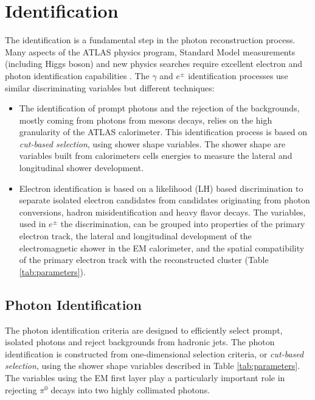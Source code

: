 \documentclass[a4paper, oneside, 11pt, openright]{book}
\begin{document}
		\section{Identification}\label{section:Ident}
			The identification is a fundamental step in the photon reconstruction process. Many aspects of the ATLAS physics program, Standard Model measurements (including Higgs boson) and new physics searches require excellent electron and photon identification capabilities \cite{el_id}\cite{ph_id}. The $\gamma$ and $e^\pm$ identification processes use similar discriminating variables but different techniques:
			\begin{itemize}
				\item The identification of prompt photons and the rejection of the backgrounds, mostly coming from photons from mesons decays, relies on the high granularity of the ATLAS calorimeter. This identification process is based on \textit{cut-based selection}, using shower shape variables. The shower shape are variables built from calorimeters cells energies to measure the lateral and longitudinal shower development.
				\item  Electron identification is based on a likelihood (LH) based discrimination to separate isolated electron candidates from candidates originating from photon conversions, hadron misidentification and heavy flavor decays. The variables, used in $e^{\pm}$ the discrimination, can be grouped into properties of the primary electron track, the lateral and longitudinal development of the electromagnetic shower in the EM calorimeter, and the spatial compatibility of the primary electron track with the reconstructed cluster (Table \ref{tab:parameters}).
			\end{itemize}
			
			\subsection{Photon Identification}
				The photon identification criteria \cite{Aad_2019} are designed to efficiently select prompt, isolated photons and reject backgrounds from hadronic jets. The photon identification is constructed from one-dimensional selection criteria, or \textit{cut-based selection}, using the shower shape variables described in Table \ref{tab:parameters}. The variables using the EM first layer play a particularly important role in rejecting $\pi^0$ decays into two highly collimated photons. 
				
\end{document}
